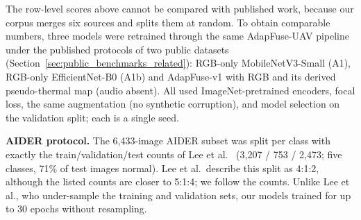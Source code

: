 \documentclass[journal]{IEEEtran}
\begin{document}
The row-level scores above cannot be compared with published work, because our corpus merges six sources and splits them at random. To obtain comparable numbers, three models were retrained through the same AdapFuse-UAV pipeline under the published protocols of two public datasets (Section~\ref{sec:public_benchmarks_related}): RGB-only MobileNetV3-Small (A1), RGB-only EfficientNet-B0 (A1b) and AdapFuse-v1 with RGB and its derived pseudo-thermal map (audio absent). All used ImageNet-pretrained encoders, focal loss, the same augmentation (no synthetic corruption), and model selection on the validation split; each is a single seed.

\textbf{AIDER protocol.} The 6{,}433-image AIDER subset was split per class with exactly the train/validation/test counts of Lee et al.~\cite{lee2023wattefnet} (3{,}207 / 753 / 2{,}473; five classes, 71\% of test images normal). Lee et al.\ describe this split as 4:1:2, although the listed counts are closer to 5:1:4; we follow the counts. Unlike Lee et al., who under-sample the training and validation sets, our models trained for up to 30 epochs without resampling.
\end{document}

